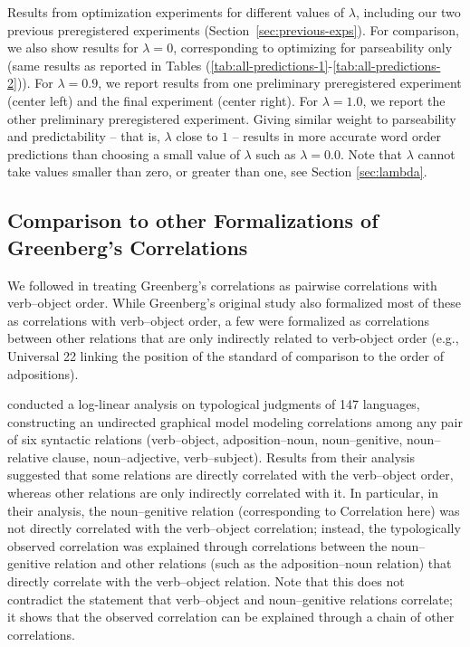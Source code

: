 \documentclass[10pt,twoside,lineno]{article}
\begin{document}
\begin{table}[hbt!]
\begin{center}
	\end{center}
	\caption{Results from optimization experiments for different values of $\lambda$, including our two previous preregistered experiments (Section~\ref{sec:previous-exps}). For comparison, we also show results for $\lambda=0$, corresponding to optimizing for parseability only (same results as reported in Tables (\ref{tab:all-predictions-1}-\ref{tab:all-predictions-2})). For $\lambda=0.9$, we report results from one preliminary preregistered experiment (center left) and the final experiment (center right). For $\lambda=1.0$, we report the other preliminary preregistered experiment.
Giving similar weight to parseability and predictability -- that is, $\lambda$ close to $1$ -- results in more accurate word order predictions than choosing a small value of $\lambda$ such as $\lambda=0.0$. Note that $\lambda$ cannot take values smaller than zero, or greater than one, see Section \ref{sec:lambda}.
}\label{table:corr-resu-previous}
\end{table}



\subsection{Comparison to other Formalizations of Greenberg's Correlations}

We followed \citet{dryer1992greenbergian} in treating Greenberg's correlations as pairwise correlations with verb--object order.
While Greenberg's original study \cite{greenberg1963universals} also formalized most of these as correlations with verb--object order, a few were formalized as correlations between other relations that are only indirectly related to verb-object order (e.g., Universal 22 linking the position of the standard of comparison to the order of adpositions).

\citet{justeson1990explanation} conducted a log-linear analysis on typological judgments of 147 languages, constructing an undirected graphical model modeling correlations among any pair of six syntactic relations (verb--object, adposition--noun, noun--genitive, noun--relative clause, noun--adjective, verb--subject).
Results from their analysis suggested that some relations are directly correlated with the verb--object order, whereas other relations are only indirectly correlated with it.
In particular, in their analysis, the noun--genitive relation (corresponding to Correlation  here) was not directly correlated with the verb--object correlation; instead, the typologically observed correlation was explained through correlations between the noun--genitive relation and other relations (such as the adposition--noun relation) that directly correlate with the verb--object relation.
Note that this does not contradict the statement that verb--object and noun--genitive relations correlate; it shows that the observed correlation can be explained through a chain of other correlations.
\end{document}
